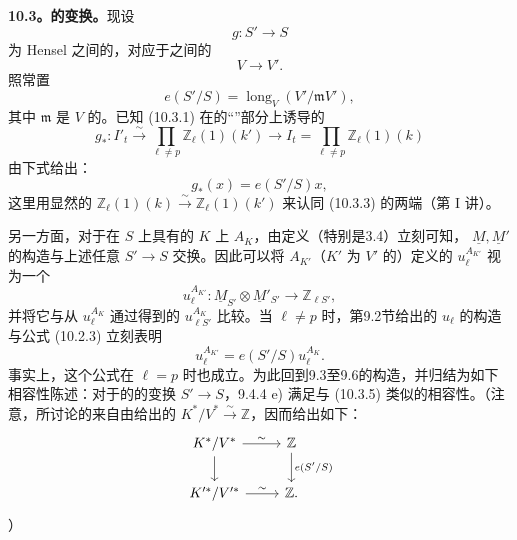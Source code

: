 \textbf{10.3。的变换。}现设
\begin{equation}\tag{10.3.1}
 g:S'\longrightarrow S
\end{equation}
为 Hensel 之间的，对应于之间的
\[
 V\longrightarrow V'.
\]
照常置
\begin{equation}\tag{10.3.2}
 e(S'/S)=\operatorname{long}_{V}(V'/\mathfrak m V'),
\end{equation}
其中 $\mathfrak m$ 是 $V$ 的。已知 (10.3.1) 在的“”部分上诱导的
\begin{equation}\tag{10.3.3}
 g_*:I'_t\xrightarrow{\sim}\prod_{\ell\ne p}\mathbb Z_\ell(1)(k')
 \longrightarrow I_t=\prod_{\ell\ne p}\mathbb Z_\ell(1)(k)
\end{equation}
由下式给出：
\begin{equation}\tag{10.3.4}
 g_*(x)=e(S'/S)x,
\end{equation}
这里用显然的 $\mathbb Z_\ell(1)(k)\xrightarrow{\sim}\mathbb Z_\ell(1)(k')$ 来认同 (10.3.3) 的两端（第 I 讲）。

另一方面，对于在 $S$ 上具有的 $K$ 上 $A_K$，由定义（特别是3.4）立刻可知， $\underline M,\underline M'$ 的构造与上述任意 $S'\longrightarrow S$ 交换。因此可以将 $A_{K'}$（$K'$ 为 $V'$ 的）定义的 $u_\ell^{A_{K'}}$ 视为一个
\[
 u_\ell^{A_{K'}}:\underline M_{S'}\otimes\underline M'_{S'}\longrightarrow\mathbb Z_{\ell S'},
\]
并将它与从 $u_\ell^{A_K}$ 通过得到的 $u_{\ell S'}^{A_K}$ 比较。当 $\ell\ne p$ 时，第9.2节给出的 $u_\ell$ 的构造与公式 (10.2.3) 立刻表明
\begin{equation}\tag{10.3.5}
 u_\ell^{A_{K'}}=e(S'/S)u_\ell^{A_K}.
\end{equation}
事实上，这个公式在 $\ell=p$ 时也成立。为此回到9.3至9.6的构造，并归结为如下相容性陈述：对于的的变换 $S'\longrightarrow S$，9.4.4 e) 满足与 (10.3.5) 类似的相容性。（注意，所讨论的来自由给出的 $K^*/V^*\xrightarrow{\sim}\mathbb Z$，因而给出如下：
\[
\begin{tikzcd}
 K^*/V^*\arrow[r,"\sim"]\arrow[d]&\mathbb Z\arrow[d,"e(S'/S)"]\\
 K'^*/V'^*\arrow[r,"\sim"]&\mathbb Z.
\end{tikzcd}
\]
）


